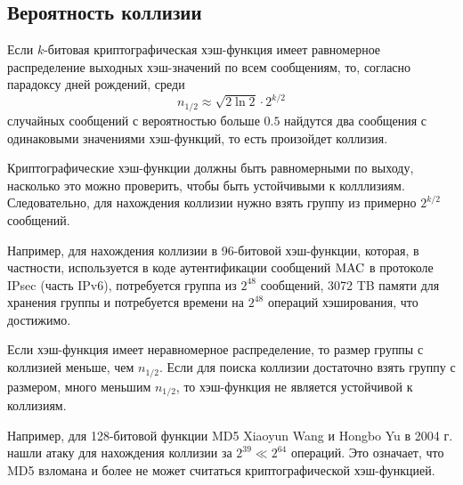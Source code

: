 \subsection{Вероятность коллизии}

Если $k$-битовая криптографическая хэш-функция имеет равномерное распределение выходных хэш-значений по всем сообщениям, то, согласно парадоксу дней рождений, среди
    \[ n_{1/2} \approx \sqrt{2 \ln 2} \cdot 2^{k/2} \]
случайных сообщений с вероятностью больше $0.5$ найдутся два сообщения с одинаковыми значениями хэш-функций, то есть произойдет коллизия.

Криптографические хэш-функции должны быть равномерными по выходу, насколько это можно проверить, чтобы быть устойчивыми к колллизиям. Следовательно, для нахождения коллизии нужно взять группу из примерно $2^{k/2}$ сообщений.

Например, для нахождения коллизии в 96-битовой хэш-функции, которая, в частности, используется в коде аутентификации сообщений $\textrm{MAC}$ в протоколе IPsec (часть IPv6), потребуется группа из $2^{48}$ сообщений, 3072 TB памяти для хранения группы и потребуется времени на $2^{48}$ операций хэширования, что достижимо.

Если хэш-функция имеет неравномерное распределение, то размер группы с коллизией меньше, чем $n_{1/2}$. Если для поиска коллизии достаточно взять группу с размером, много меньшим $n_{1/2}$, то хэш-функция не является устойчивой к коллизиям.

Например, для 128-битовой функции MD5 Xiaoyun Wang и Hongbo Yu в 2004 г. нашли атаку для нахождения коллизии за $2^{39} \ll 2^{64}$ операций. Это означает, что MD5 взломана и более не может считаться криптографической хэш-функцией.
